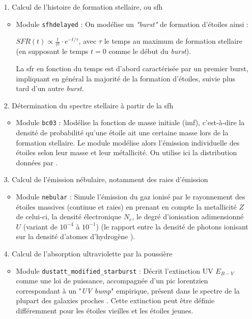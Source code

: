 \documentclass[12pt, a4paper]{article}
\begin{document}
\begin{itemize}
  \item[1.] Calcul de l'histoire de formation stellaire, ou \gls{sfh}
  \begin{itemize}
    \item Module \texttt{sfhdelayed} : On modélise un \textit{"burst"} de formation d'étoiles ainsi :
    
     $SFR(t) \propto \frac{t}{\tau^2} \cdot e^{-t/\tau}$, avec $\tau$ le temps au maximum de formation stellaire (en supposant le temps $t=0$ comme le début du \textit{burst}).

    La \gls{sfr} en fonction du temps est d'abord caractérisée par un premier burst, impliquant en général la majorité de la formation d'étoiles, suivie plus tard d'un autre \textit{burst}.
  \end{itemize}

  \item[2.] Détermination du spectre stellaire à partir de la \gls{sfh}
  \begin{itemize}
    \item Module \texttt{bc03} : Modélise la fonction de masse initiale (\gls{imf}), c'est-à-dire la densité de probabilité qu'une étoile ait une certaine masse lors de la formation stellaire. Le module modélise alors l'émission individuelle des étoiles selon leur masse et leur métallicité. On utilise ici la distribution données par \cite{2003PASP..115..763C}.
  \end{itemize}

  \item[3.] Calcul de l'émission nébulaire, notamment des raies d'émission
  \begin{itemize}
    \item Module \texttt{nebular} : Simule l'émission du gaz ionisé par le rayonnement des étoiles massives (continue et raies) en prenant en compte la metallicité $Z$ de celui-ci, la densité électronique $N_e$, le degré d'ionisation adimensionné $U$ (variant de $10^{-4}$ à $10^{-1}$) (le rapport entre la densité de photons ionisant sur la densité d'atomes d'hydrogène \parencite{Astrophysics-of-the-Diffuse-Universe}).
  \end{itemize}

  \item[4.] Calcul de l'absorption ultraviolette par la poussière
  \begin{itemize}
    \item Module \texttt{dustatt\_modified\_starburst} : Décrit l'extinction UV $E_{B-V}$ comme une loi de puissance, accompagnée d'un pic lorentzien correspondant à un "\textit{UV bump}" empirique, présent dans le spectre de la plupart des galaxies proches \parencite{10.1093/mnras/stac1313}. Cette extinction peut être définie différemment pour les étoiles vieilles et les étoiles jeunes.
  \end{itemize}


\end{itemize}
\end{document}
